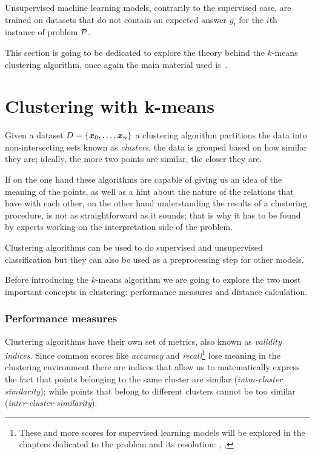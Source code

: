 Unsupervised machine learning models, contrarily to the supervised case, are trained on datasets
that do not contain an expected answer $y_i$ for the $i$th instance of problem $\mathcal{P}$.

This section is going to be dedicated to explore the theory behind the $k$-means clustering
algorithm, once again the main material used is~\cite{ZhouZhi-Hua2021ML}.

\section{Clustering with k-means}
\label{sec:kmeans}
Given a dataset $D = \{\boldsymbol{x}_0, \ldots, \boldsymbol{x}_n\}$ a clustering algorithm partitions the data into non-intersecting sets
known as \emph{clusters}, the data is grouped based on how similar they are; ideally, the more two
points are similar, the closer they are.

If on the one hand these algorithms are capable of giving us an idea of the
meaning of the points, as well as a hint about the nature of the relations that have with each
other, on the other hand understanding the results of a clustering procedure, is not as
straightforward as it sounds; that is why it has to be found by experts working on the
interpretation side of the problem.

Clustering algorithms can be used to do supervised and unsupervised classification but they can also
be used as a preprocessing step for other models.

\medskip

Before introducing the $k$-means algorithm we are going to explore the two most important concepts
in clustering: performance measures and distance calculation.

\subsubsection{Performance measures}
\label{ssec:performance-measures}
Clustering algorithms have their own set of metrics, also known as \emph{validity indices}. Since
common scores like \emph{accuracy} and \emph{recall}\footnote{These and more scores for supervised
learning models will be explored in the chapters dedicated to the problem and its resolution: ,
, } lose meaning in the clustering
environment there are indices that allow us to matematically express the fact that points belonging
to the same cluster are similar (\emph{intra-cluster similarity}); while points that belong to
different clusters cannot be too similar (\emph{inter-cluster similarity}).

